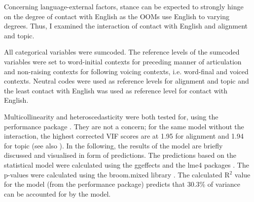 \documentclass[output=paper]{langscibook}
\begin{document}
\hspace*{-2.8pt}Concerning language-external factors, stance can be expected to strongly hinge on the degree of contact with English as the \glspl*{OOM} use English to varying degrees. Thus, I examined the interaction of contact with English and alignment and topic.

All categorical variables were sumcoded. The reference levels of the sumcoded variables were set to word-initial contexts for preceding manner of articulation and non-raising contexts for following voicing contexts, i.e. word-final and voiced contexts. Neutral codes were used as reference levels for alignment and topic and the least contact with English was used as reference level for contact with English.

Multicollinearity and heteroscedasticity were both tested for, using the performance package \citep{ludecke_performance_2021}. They are not a concern; for the same model without the interaction, the highest corrected VIF scores are at 1.95 for alignment and 1.94 for topic (see also \citealt[160]{levshina_how_2015}). In the following, the results of the model are briefly discussed and visualised in form of predictions. The predictions based on the statistical model were calculated using the ggeffects \citep{ludecke_ggeffects_2018} and the lme4 packages \citep{bates_fitting_2015}. The p-values were calculated using the broom.mixed library \citep{bolker_robinson_2022}. The calculated R$^2$ value for the model (from the performance package) predicts that 30.3\% of variance can be accounted for by the model.


%
\end{document}
